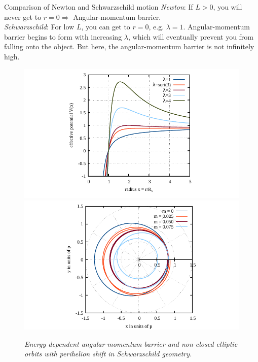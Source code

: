 	\begin{mybox}{Comparison of Newton and Schwarzschild motion}
		\emph{Newton}: If $L>0$, you will never get to $r=0 \Rightarrow$ Angular-momentum barrier.\\
		\emph{Schwarzschild}: For low $L$, you can get to $r=0$, e.g. $\lambda=1$. Angular-momentum barrier begins to form with increasing $\lambda$, which will eventually prevent you from falling onto the object. But here, the angular-momentum barrier is not infinitely high.
	\end{mybox}
	\begin{figure}
		\centering
		\includegraphics[width=0.48\linewidth]{gfx/fig09-1}
		\includegraphics[width=0.48\linewidth]{gfx/fig09-2}
		\caption{\itshape Energy dependent angular-momentum barrier and non-closed elliptic orbits with perihelion shift in Schwarzschild geometry.}
		\label{fig:fig09-1}
	\end{figure}
	
